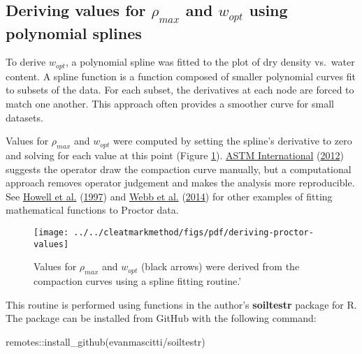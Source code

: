 \documentclass[
  letterpaper,
  openany]{book}
\newenvironment{Shaded}{\begin{snugshade}}{\end{snugshade}}
\newcommand{\FunctionTok}[1]{\textcolor[rgb]{0.00,0.00,0.00}{#1}}
\newcommand{\NormalTok}[1]{#1}
\newcommand{\SpecialCharTok}[1]{\textcolor[rgb]{0.00,0.00,0.00}{#1}}
\newcommand{\StringTok}[1]{\textcolor[rgb]{0.31,0.60,0.02}{#1}}
\begin{document}
\hypertarget{deriving-values-from-proctor-curves}{%
\subsection{\texorpdfstring{Deriving values for \(\rho_{max}\) and \(w_{opt}\) using polynomial splines}{Deriving values for \textbackslash rho\_\{max\} and w\_\{opt\} using polynomial splines}}\label{deriving-values-from-proctor-curves}}

To derive \(w_{opt}\), a polynomial spline was fitted to the plot of dry density vs.~water content.
A spline function is a function composed of smaller polynomial curves fit to subsets of the data.
For each subset, the derivatives at each node are forced to match one another.
This approach often provides a smoother curve for small datasets.

Values for \(\rho_{max}\) and \(w_{opt}\) were computed by setting the spline's derivative to zero and solving for each value at this point (Figure \ref{fig:deriving-proctor-values}).
\protect\hyperlink{ref-ASTMD698-12}{ASTM International} (\protect\hyperlink{ref-ASTMD698-12}{2012}) suggests the operator draw the compaction curve manually, but a computational approach
removes operator judgement and makes the analysis more reproducible.
See \protect\hyperlink{ref-Howell1997}{Howell et al.} (\protect\hyperlink{ref-Howell1997}{1997}) and \protect\hyperlink{ref-Webb2014}{Webb et al.} (\protect\hyperlink{ref-Webb2014}{2014}) for other examples of fitting mathematical functions to Proctor data.



\begin{figure}

{\centering \texttt{[image: ../../cleatmarkmethod/figs/pdf/deriving-proctor-values]} 

}

\caption[Example compaction curves prior to cleat-mark test]{Values for \(\rho_{max}\) and \(w_{opt}\) (black arrows) were derived from the compaction curves using a spline fitting routine.'}\label{fig:deriving-proctor-values}
\end{figure}

This routine is performed using functions in the author's \textbf{soiltestr} package for R.
The package can be installed from GitHub with the following command:

\begin{Shaded}
\begin{Highlighting}[]
\NormalTok{remotes}\SpecialCharTok{::}\FunctionTok{install\_github}\NormalTok{(}\StringTok{\textquotesingle{}evanmascitti/soiltestr\textquotesingle{}}\NormalTok{)}
\end{Highlighting}
\end{Shaded}
\end{document}
